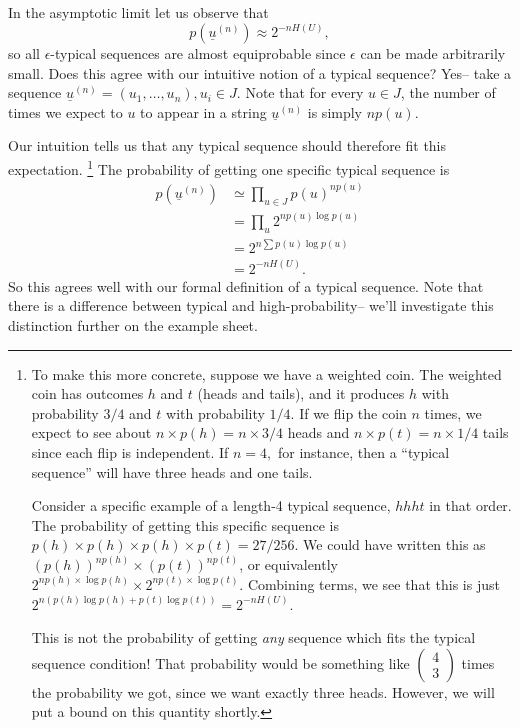 In the asymptotic limit let us observe that
\begin{equation}
    p(\underline{u}^{(n)})\approx 2^{-nH(U)},
\end{equation}
so all $\epsilon$-typical sequences are almost equiprobable since $\epsilon$ can be made arbitrarily small. Does this agree with our intuitive notion of a typical sequence? Yes-- take a sequence $\underline{u}^{(n)}=(u_1,\ldots, u_n), u_i \in J$. %
Note that for every $u\in J$, the number of times we expect to $u$ to appear in a string $\underline{u}^{(n)}$ is simply $np(u)$.

Our intuition tells us that any typical sequence should therefore fit this expectation.%
    \footnote{To make this more concrete, suppose we have a weighted coin. The weighted coin has outcomes $h$ and $t$ (heads and tails), and it produces $h$ with probability $3/4$ and $t$ with probability $1/4$. If we flip the coin $n$ times, we expect to see about $n\times p(h)=n\times 3/4$ heads and $n\times p(t)= n\times 1/4$ tails since each flip is independent. If $n=4,$ for instance, then a ``typical sequence'' will have three heads and one tails.
    
    Consider a specific example of a length-4 typical sequence, $hhht$ in that order. The probability of getting this specific sequence is $p(h)\times p(h) \times p(h)\times p(t)=27/256$. We could have written this as $(p(h))^{n p(h)}\times (p(t))^{np(t)}$, or equivalently $2^{np(h) \times \log p(h)}\times 2^{np(t) \times \log p(t)}$. Combining terms, we see that this is just $2^{n (p(h) \log p(h) + p(t)\log p(t))}= 2^{-n H(U)}$.
    
    This is not the probability of getting \emph{any} sequence which fits the typical sequence condition! That probability would be something like $\begin{pmatrix}4\\3\end{pmatrix}$ times the probability we got, since we want exactly three heads. However, we will put a bound on this quantity shortly.}
The probability of getting one specific typical sequence is
\begin{align*}
    p(\underline{u}^{(n)}) %
    &\simeq \prod_{u\in J} p(u)^{np(u)}\\
    &= \prod_u 2^{np(u) \log p(u)}\\
    &= 2^{n\sum p(u) \log p(u)}\\
    &= 2^{-n H(U)}.
\end{align*}
So this agrees well with our formal definition of a typical sequence. Note that there is a difference between typical and high-probability-- we'll investigate this distinction further on the example sheet.
    
